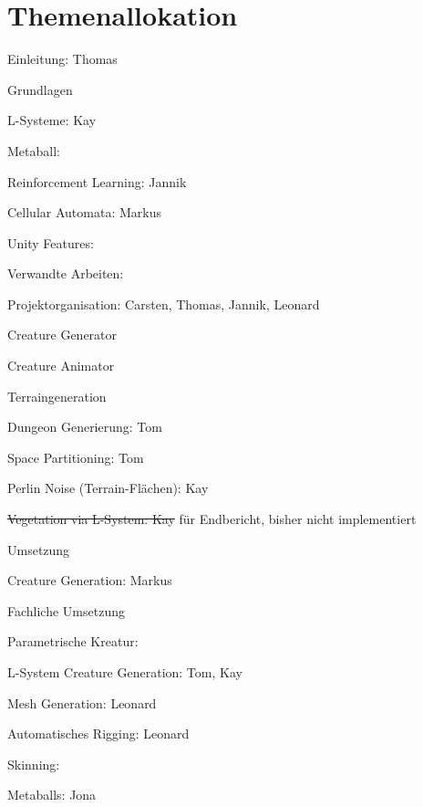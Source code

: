 \chapter*{Themenallokation}

\begin{thallok}
	\item Einleitung: Thomas
	\item Grundlagen
	\begin{thallok}
		\item L-Systeme: Kay
		\item Metaball: 
		\item Reinforcement Learning: Jannik
		\item Cellular Automata: Markus
		\item Unity Features: 		
	\end{thallok}
	\item Verwandte Arbeiten: 
	\item Projektorganisation: Carsten, Thomas, Jannik, Leonard
	\begin{thallok}
		\item Creature Generator
		\item Creature Animator
		\item Terraingeneration
		\begin{thallok}
			\item Dungeon Generierung: Tom
			\item Space Partitioning: Tom
			\item Perlin Noise (Terrain-Flächen): Kay
			\item \sout{Vegetation via L-System: Kay} für Endbericht, bisher nicht implementiert
		\end{thallok}
	\end{thallok}
	\item Umsetzung
	\begin{thallok}
		\item Creature Generation: Markus
		\begin{thallok}
			\item Fachliche Umsetzung
				\begin{thallok}
					\item Parametrische Kreatur:
					\item L-System Creature Generation: Tom, Kay
					\item Mesh Generation: Leonard
					\item Automatisches Rigging: Leonard
					\item Skinning: 
					\item Metaballs: Jona

\end{thallok}
\end{thallok}
\end{thallok}
\end{thallok}

